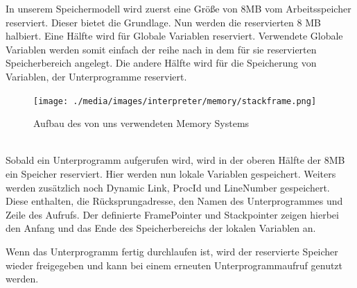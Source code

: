 In unserem Speichermodell wird zuerst eine Größe von 8MB vom Arbeitsspeicher reserviert. Dieser bietet die Grundlage. Nun werden die reservierten 8 MB halbiert. Eine Hälfte wird für Globale Variablen reserviert. Verwendete Globale Variablen werden somit einfach der reihe nach in dem für sie reservierten Speicherbereich angelegt. Die andere Hälfte wird für die Speicherung von Variablen, der Unterprogramme reserviert.

\begin{figure}[Stack Frame]
\begin{center}
\texttt{[image: ./media/images/interpreter/memory/stackframe.png]}
\label{fig:stackframe1} 
\caption{Aufbau des von uns verwendeten Memory Systems}
\end{center}
\end{figure}
\\
Sobald ein Unterprogramm aufgerufen wird, wird in der oberen Hälfte der 8MB ein Speicher reserviert. Hier werden nun lokale Variablen gespeichert. Weiters werden zusätzlich noch Dynamic Link, ProcId und LineNumber gespeichert. Diese enthalten, die Rücksprungadresse, den Namen des Unterprogrammes und Zeile des Aufrufs. Der definierte FramePointer und Stackpointer zeigen hierbei den Anfang und das Ende des Speicherbereichs der lokalen Variablen an.

Wenn das Unterprogramm fertig durchlaufen ist, wird der reservierte Speicher wieder freigegeben und kann bei einem erneuten Unterprogrammaufruf genutzt werden.


%

